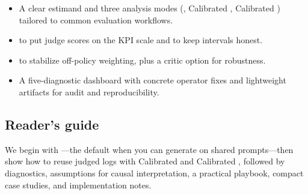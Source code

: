\begin{itemize}
\item A clear estimand and three analysis modes (\dm, Calibrated \ips, Calibrated \dr) tailored to common evaluation workflows.

\item \autocal{} to put judge scores on the KPI scale and \oua{} to keep intervals honest.

\item \simcal{} to stabilize off-policy weighting, plus a critic option for \dr{} robustness.

\item A five-diagnostic dashboard with concrete operator fixes and lightweight artifacts for audit and reproducibility.
\end{itemize}

\subsection{Reader's guide}

We begin with \dm---the default when you can generate on shared prompts---then show how to reuse judged logs with Calibrated \ips{} and Calibrated \dr, followed by diagnostics, assumptions for causal interpretation, a practical playbook, compact case studies, and implementation notes.

